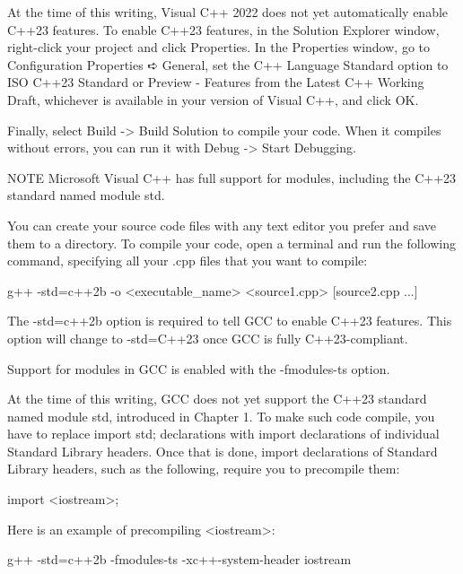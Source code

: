 At the time of this writing, Visual C++ 2022 does not yet automatically enable C++23 features. To enable C++23 features, in the Solution Explorer window, right-click your project and click Properties. In the Properties window, go to Configuration Properties ➪ General, set the C++ Language Standard option to ISO C++23 Standard or Preview - Features from the Latest C++ Working Draft, whichever is available in your version of Visual C++, and click OK.

Finally, select Build -> Build Solution to compile your code. When it compiles without errors, you can run it with Debug -> Start Debugging.

\begin{myNotic}{NOTE}
Microsoft Visual C++ has full support for modules, including the C++23 standard named module std.
\end{myNotic}


You can create your source code files with any text editor you prefer and save them to a directory. To compile your code, open a terminal and run the following command, specifying all your .cpp files that you want to compile:

\begin{shell}
g++ -std=c++2b -o <executable_name> <source1.cpp> [source2.cpp ...]
\end{shell}

The -std=c++2b option is required to tell GCC to enable C++23 features. This option will change to -std=C++23 once GCC is fully C++23-compliant.


Support for modules in GCC is enabled with the -fmodules-ts option.

At the time of this writing, GCC does not yet support the C++23 standard named module std, introduced in Chapter 1. To make such code compile, you have to replace import std; declarations with import declarations of individual Standard Library headers. Once that is done, import declarations of Standard Library headers, such as the following, require you to precompile them:

\begin{cpp}
import <iostream>;
\end{cpp}

Here is an example of precompiling <iostream>:

\begin{shell}
g++ -std=c++2b -fmodules-ts -xc++-system-header iostream
\end{shell}


